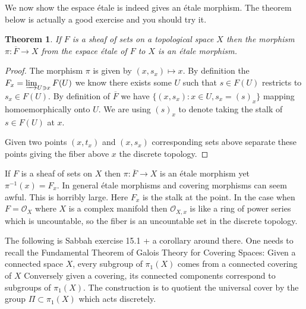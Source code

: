 \documentclass[12pt]{book}
\numberwithin{equation}{section}
\newtheorem{theorem}{Theorem}[subsection]
\theoremstyle{definition}
\theoremstyle{remark}
\newcommand{\Ocal}{\mathcal{O}}
\begin{document}
We now show the espace \'etale is indeed gives an \'etale morphism. 
The theorem below is actually a good exercise and you should try it.
\begin{theorem}
	If $F$ is a sheaf of sets on a topological space $X$ then the morphism $\pi: \overline{F}\to X$ from the espace \'etale of $F$ to $X$ is an \'etale morphism.
\end{theorem}
\begin{proof}
	The morphism $\pi$ is given by $(x,s_x)\mapsto x$. 
	By definition the $F_x = \varinjlim_{U \owns x} F(U)$ we know there exists some $U$ such that $s\in F(U)$ restricts to $s_x \in F(U)$. 
	By definition of $\overline{F}$ we have $\lbrace (x,s_x) \colon x\in U, s_x = (s)_x \rbrace$ mapping homoemorphically onto $U$. 
	We are using $(s)_x$ to denote taking the stalk of $s \in F(U)$ at $x$.
	
	Given two points $(x,t_x)$ and $(x,s_x)$ corresponding sets above separate these points giving the fiber above $x$ the discrete topology.
\end{proof}

If $F$ is a sheaf of sets on $X$ then $\pi: \overline{F} \to X$ is an \'etale morphism yet $\pi^{-1}(x) = F_x$. 
In general \'etale morphisms and covering morphisms can seem awful. 
This is horribly large. 
Here $F_x$ is the stalk at the point. 
In the case when $F = \Ocal_X$ where $X$ is a complex manifold then $\Ocal_{X,x}$ is like a ring of power series which is uncountable, so the fiber is an uncountable set in the discrete topology. 


The following is Sabbah exercise 15.1 + a corollary around there. 
One needs to recall the Fundamental Theorem of Galois Theory for Covering Spaces: Given a connected space $X$, every subgroup of $\pi_1(X)$ comes from a connected covering of $X$ 
Conversely given a covering, its connected components correspond to subgroups of $\pi_1(X)$. 
The construction is to quotient the universal cover by the group $\Pi \subset \pi_1(X)$ which acts discretely.
\end{document}

